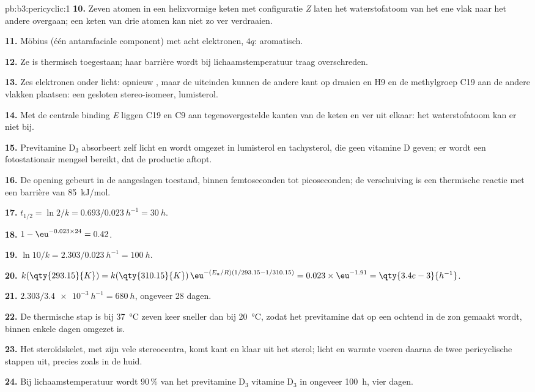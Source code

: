 \begin{solution}{pb:b3:pericyclic:1}
\textbf{10.} Zeven atomen in een helixvormige keten met configuratie \textit{Z} laten het waterstofatoom van het ene vlak naar
het andere overgaan; een keten van drie atomen kan niet zo ver
verdraaien.

\textbf{11.} Möbius (één antarafaciale component) met acht elektronen, $4q$: aromatisch.

\textbf{12.} Ze is thermisch toegestaan; haar barrière wordt bij
lichaamstemperatuur traag overschreden.

\textbf{13.} Zes elektronen onder licht: opnieuw , maar de
uiteinden kunnen de andere kant op draaien en H9 en de methylgroep C19 aan
de andere vlakken plaatsen: een gesloten stereo-isomeer, lumisterol.

\textbf{14.} Met de centrale binding \textit{E} liggen C19 en C9 aan tegenovergestelde kanten van de keten en ver
uit elkaar: het waterstofatoom kan er niet bij.

\textbf{15.} Previtamine D$_3$ absorbeert zelf licht en wordt omgezet in lumisterol en tachysterol,
die geen vitamine D geven; er wordt een fotostationair mengsel bereikt,
dat de productie aftopt.

\textbf{16.} De opening gebeurt in de aangeslagen toestand, binnen
femtoseconden tot picoseconden; de verschuiving is een thermische reactie met een barrière van \qty{85}{kJ/mol}.

\textbf{17.} $t_{1/2} = \ln 2/k = 0.693/\qty{0.023}{h^{-1}} = \qty{30}{h}$.

\textbf{18.} $1 - \eu^{-0.023 \times 24} = 0.42$.

\textbf{19.} $\ln 10/k = 2.303/\qty{0.023}{h^{-1}} = \qty{100}{h}$.

\textbf{20.} $k(\qty{293.15}{K}) = k(\qty{310.15}{K})\,\eu^{-(E_a/R)(1/293.15 - 1/310.15)} = 0.023 \times \eu^{-1.91} = \qty{3.4e-3}{h^{-1}}$.

\textbf{21.} $2.303/\qty{3.4e-3}{h^{-1}} = \qty{680}{h}$, ongeveer 28 dagen.

\textbf{22.} De thermische stap is bij \qty{37}{\celsius} zeven keer sneller dan bij \qty{20}{\celsius}, zodat het
previtamine dat op een ochtend in de zon gemaakt wordt, binnen enkele
dagen omgezet is.

\textbf{23.} Het steroïdskelet, met zijn vele stereocentra, komt kant en
klaar uit het sterol; licht en warmte voeren daarna de twee
pericyclische stappen uit, precies zoals in de huid.

\textbf{24.} Bij lichaamstemperatuur wordt 90\,\% van het previtamine D$_3$ vitamine D$_3$ in ongeveer
\qty{100}{h}, vier dagen.
\end{solution}
